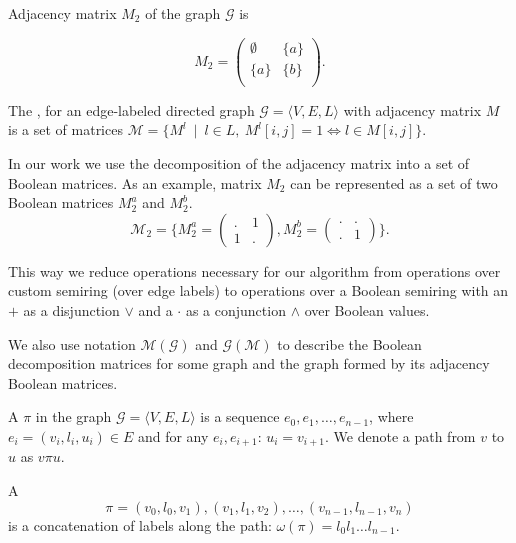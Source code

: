 Adjacency matrix $M_2$ of the graph $\mathcal{G}$ is

$$
    M_2 =
    \begin{pmatrix}
    \emptyset & \{a\}     \\
   \{a\}   &   \{b\}     \\
    \end{pmatrix}.
$$

\begin{definition}
The ,
for an edge-labeled directed graph $\mathcal{G} =
\langle V,E,L \rangle$ with adjacency matrix $M$ is a set of matrices $\mathcal{M} = \{ M^l~\mid~l \in L, \ M^l[i,j] = 1 \iff l \in M[i,j]\}$.
\end{definition}

In our work we use the decomposition of the adjacency matrix into a set of Boolean matrices. As an example, matrix $M_2$ can be represented as a set of two Boolean matrices $M_2^a$ and $M_2^b$.
$$
\mathcal{M}_2 =\bigg\{
M_2^{a} =
\begin{pmatrix}
    . & 1     \\
    1 & .
\end{pmatrix},
M_2^{b} =
\begin{pmatrix}
    . & .    \\
    . & 1
\end{pmatrix}
\bigg\}.
$$

This way we reduce operations necessary for our algorithm from
operations over custom semiring (over edge labels) to operations over a Boolean semiring with an  $+$ as a disjunction $\lor$ and a  $\cdot$ as a conjunction $\land$ over Boolean values.

We also use notation $\mathcal{M}(\mathcal{G})$ and $\mathcal{G}(\mathcal{M})$ to describe the Boolean decomposition matrices for some graph and the graph formed by its adjacency Boolean matrices.

\begin{definition}
A  $\pi$ in the graph $\mathcal{G} = \langle V,E,L \rangle$ is a sequence $e_0,e_1,\ldots,e_{n-1}$, where $e_i = (v_i,l_i,u_i) \in E$ and for any $e_i, e_{i+1}$: $u_i = v_{i+1}$. We denote a path from $v$ to $u$ as $v\pi u$.
\end{definition}

\begin{definition}
A  $$\pi = (v_0,l_0,v_1),(v_1,l_1,v_2),\ldots,(v_{n-1},l_{n-1},v_n)$$ is a concatenation of labels along the path: $\omega(\pi) = l_0 l_1 \ldots l_{n-1}$.
\end{definition}



